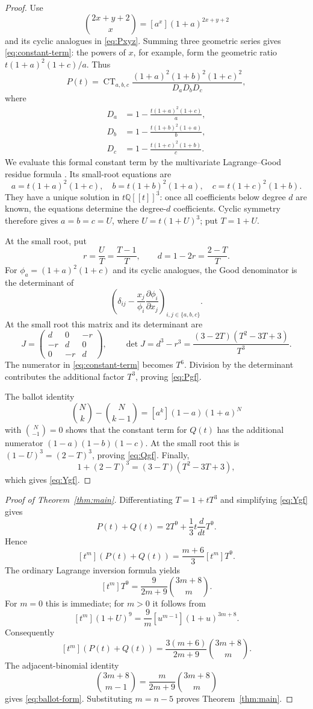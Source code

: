 \documentclass[11pt]{amsart}
\theoremstyle{definition}
\newcommand{\CT}{\operatorname{CT}}
\begin{document}
\begin{proof}
Use
\[
 \binom{2x+y+2}{x}=[a^x](1+a)^{2x+y+2}
\]
and its cyclic analogues in \eqref{eq:Pxyz}.  Summing three geometric series
gives \eqref{eq:constant-term}: the powers of $x$, for example, form the
geometric ratio $t(1+a)^2(1+c)/a$.  Thus
\begin{equation}\label{eq:constant-term}
 P(t)=\CT_{a,b,c}
 \frac{(1+a)^2(1+b)^2(1+c)^2}{D_aD_bD_c},
\end{equation}
where
\begin{align*}
 D_a&=1-\frac{t(1+a)^2(1+c)}a,\\
 D_b&=1-\frac{t(1+b)^2(1+a)}b,\\
 D_c&=1-\frac{t(1+c)^2(1+b)}c.
\end{align*}
We evaluate this formal constant term by the multivariate Lagrange--Good
residue formula \cite{Good}.  Its small-root equations are
\[
 a=t(1+a)^2(1+c),\quad
 b=t(1+b)^2(1+a),\quad
 c=t(1+c)^2(1+b).
\]
They have a unique solution in $t\mathbb Q[[t]]^3$: once all coefficients
below degree $d$ are known, the equations determine the degree-$d$
coefficients.  Cyclic symmetry therefore gives $a=b=c=U$, where
$U=t(1+U)^3$; put $T=1+U$.

At the small root, put
\[
 r=\frac UT=\frac{T-1}{T},\qquad
 d=1-2r=\frac{2-T}{T}.
\]
For $\phi_a=(1+a)^2(1+c)$ and its cyclic analogues, the Good denominator is
the determinant of
\[
 \left(\delta_{ij}-\frac{x_j}{\phi_i}
 \frac{\partial\phi_i}{\partial x_j}\right)_{i,j\in\{a,b,c\}}.
\]
At the small root this matrix and its determinant are
\[
 J=\begin{pmatrix}d&0&-r\\-r&d&0\\0&-r&d\end{pmatrix},
 \qquad
 \det J=d^3-r^3
 =\frac{(3-2T)(T^2-3T+3)}{T^3}.
\]
The numerator in \eqref{eq:constant-term} becomes $T^6$.  Division by the
determinant contributes the additional factor $T^3$, proving
\eqref{eq:Pgf}.

The ballot identity
\[
 \binom Nk-\binom N{k-1}=[a^k](1-a)(1+a)^N
\]
with $\binom N{-1}=0$ shows that the constant term for $Q(t)$ has the additional numerator
$(1-a)(1-b)(1-c)$.  At the small root this is $(1-U)^3=(2-T)^3$, proving
\eqref{eq:Qgf}.  Finally,
\[
 1+(2-T)^3=(3-T)(T^2-3T+3),
\]
which gives \eqref{eq:Ygf}.
\end{proof}

\begin{proof}[Proof of Theorem~\ref{thm:main}]
Differentiating $T=1+tT^3$ and simplifying \eqref{eq:Ygf} gives
\[
 P(t)+Q(t)=2T^9+\frac13t\frac{d}{dt}T^9.
\]
Hence
\[
 [t^m](P(t)+Q(t))=\frac{m+6}{3}[t^m]T^9.
\]
The ordinary Lagrange inversion formula yields
\[
 [t^m]T^9=\frac9{2m+9}\binom{3m+8}{m}.
\]
For $m=0$ this is immediate; for $m>0$ it follows from
\[
 [t^m](1+U)^9=\frac9m[u^{m-1}](1+u)^{3m+8}.
\]
Consequently
\[
 [t^m](P(t)+Q(t))
 =\frac{3(m+6)}{2m+9}\binom{3m+8}{m}.
\]
The adjacent-binomial identity
\[
 \binom{3m+8}{m-1}=\frac{m}{2m+9}\binom{3m+8}{m}
\]
gives \eqref{eq:ballot-form}.  Substituting $m=n-5$ proves
Theorem~\ref{thm:main}.
\end{proof}
\end{document}
